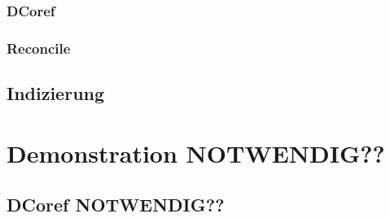 \documentclass[a4paper,12pt,titlepage=true, ngerman]{scrartcl}
\begin{document}

\subsubsection{DCoref}%



\subsubsection{Reconcile}%


\subsection{Indizierung}%



%








\newpage

\section{Demonstration NOTWENDIG??}\label{Demonstration} %



\subsection{DCoref NOTWENDIG??}%



\newpage

\printbibliography[title=Literaturverzeichnis, heading=bibintoc]
\end{document}
